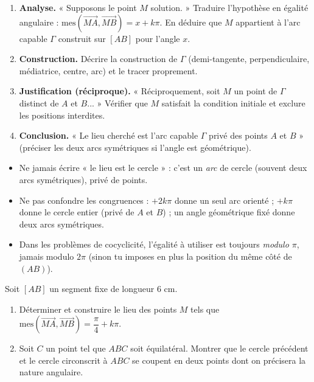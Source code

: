 \documentclass[11pt]{article}
\begin{document}
\begin{methode}
\begin{enumerate}
\item \textbf{Analyse.} « Supposons le point $M$ solution. » Traduire l'hypothèse en égalité angulaire : $\text{mes}(\overrightarrow{MA},\overrightarrow{MB}) = x + k\pi$. En déduire que $M$ appartient à l'arc capable $\Gamma$ construit sur $[AB]$ pour l'angle $x$.
\item \textbf{Construction.} Décrire la construction de $\Gamma$ (demi-tangente, perpendiculaire, médiatrice, centre, arc) et le tracer proprement.
\item \textbf{Justification (réciproque).} « Réciproquement, soit $M$ un point de $\Gamma$ distinct de $A$ et $B$... » Vérifier que $M$ satisfait la condition initiale et exclure les positions interdites.
\item \textbf{Conclusion.} « Le lieu cherché est l'arc capable $\Gamma$ privé des points $A$ et $B$ » (préciser les deux arcs symétriques si l'angle est géométrique).
\end{enumerate}
\end{methode}

\begin{attention}
\begin{itemize}
\item Ne jamais écrire « le lieu est le cercle » : c'est un \emph{arc} de cercle (souvent deux arcs symétriques), privé de points.
\item Ne pas confondre les congruences : $+2k\pi$ donne un seul arc orienté ; $+k\pi$ donne le cercle entier (privé de $A$ et $B$) ; un angle géométrique fixé donne deux arcs symétriques.
\item Dans les problèmes de cocyclicité, l'égalité à utiliser est toujours \emph{modulo $\pi$}, jamais modulo $2\pi$ (sinon tu imposes en plus la position du même côté de $(AB)$).
\end{itemize}
\end{attention}

\begin{exercice}
Soit $[AB]$ un segment fixe de longueur $6$ cm.
\begin{enumerate}
\item Déterminer et construire le lieu des points $M$ tels que $\text{mes}(\overrightarrow{MA},\overrightarrow{MB}) = \dfrac{\pi}{4} + k\pi$.
\item Soit $C$ un point tel que $ABC$ soit équilatéral. Montrer que le cercle précédent et le cercle circonscrit à $ABC$ se coupent en deux points dont on précisera la nature angulaire.
\end{enumerate}
\end{exercice}
\end{document}
